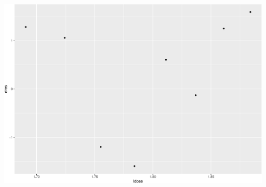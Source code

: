 \documentclass[
  ignorenonframetext,
]{beamer}
\begin{document}
\begin{frame}[fragile]
\includegraphics{3BinRegPresentation_files/figure-beamer/unnamed-chunk-28-2.pdf}
\end{frame}
\end{document}
